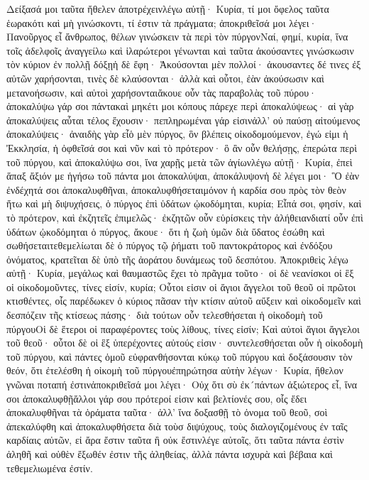 Δείξασά μοι ταῦτα ἤθελεν ἀποτρέχεινλέγω αὐτῇ· Κυρία, τί μοι ὄφελος ταῦτα ἑωρακότι καὶ μὴ γινώσκοντι, τί ἐστιν τὰ πράγματα; ἀποκριθεῖσά μοι λέγει· Πανοῦργος εἶ ἄνθρωπος, θέλων γινώσκειν τὰ περὶ τὸν πύργονΝαί, φημί, κυρία, ἵνα τοῖς ἀδελφοῖς ἀναγγείλω καὶ ἱλαρώτεροι γένωνται καὶ ταῦτα ἀκούσαντες γινώσκωσιν τὸν κύριον ἐν πολλῇ δόξῃἡ δὲ ἔφη· Ἀκούσονται μὲν πολλοί· ἀκουσαντες δέ τινες ἐξ αὐτῶν χαρήσονται, τινὲς δὲ κλαύσονται· ἀλλὰ καὶ οὗτοι, ἐὰν ἀκούσωσιν καὶ μετανοήσωσιν, καὶ αὐτοὶ χαρήσονταιἄκουε οὖν τὰς παραβολὰς τοῦ πύρου· ἀποκαλύψω γάρ σοι πάντακαὶ μηκέτι μοι κόπους πάρεχε περὶ ἀποκαλύψεως· αἱ γὰρ ἀποκαλύψεις αὗται τέλος ἔχουσιν· πεπληρωμέναι γάρ εἰσινἀλλ’ οὐ παύσῃ αἰτούμενος ἀποκαλύψεις· ἀναιδὴς γὰρ εἶὁ μὲν πύργος, ὃν βλέπεις οἰκοδομούμενον, ἐγώ εἰμι ἡ Ἐκκλησία, ἡ ὀφθεῖσά σοι καὶ νῦν καὶ τὸ πρότερον· ὃ ἂν οὖν θελήσῃς, ἐπερώτα περὶ τοῦ πύργου, καὶ ἀποκαλύψω σοι, ἵνα χαρῇς μετὰ τῶν ἁγίωνλέγω αὐτῇ· Κυρία, ἐπεὶ ἅπαξ ἄξιόν με ἡγήσω τοῦ πάντα μοι ἀποκαλύψαι, ἀποκάλυψονἡ δὲ λέγει μοι· Ὃ ἐὰν ἐνδέχητά σοι ἀποκαλυφθῆναι, ἀποκαλυφθήσεταιμόνον ἡ καρδία σου πρὸς τὸν θεὸν ἤτω καὶ μὴ διψυχήσεις, ὁ πύργος ἐπὶ ὑδάτων ᾠκοδόμηται, κυρία; Εἶπά σοι, φησίν, καὶ τὸ πρότερον, καὶ ἐκζητεῖς ἐπιμελῶς· ἐκζητῶν οὖν εὑρίσκεις τὴν ἀλήθειανδιατί οὖν ἐπὶ ὑδάτων ᾠκοδόμηται ὁ πύργος, ἄκουε· ὅτι ἡ ζωὴ ὑμῶν διὰ ὕδατος ἐσώθη καὶ σωθήσεταιτεθεμελίωται δὲ ὁ πύργος τῷ ῥήματι τοῦ παντοκράτορος καὶ ἐνδόξου ὀνόματος, κρατεῖται δὲ ὑπὸ τῆς ἀοράτου δυνάμεως τοῦ δεσπότου.
Ἀποκριθεὶς λέγω αὐτῇ· Κυρία, μεγάλως καὶ θαυμαστῶς ἔχει τὸ πρᾶγμα τοῦτο· οἱ δὲ νεανίσκοι οἱ ἓξ οἱ οἰκοδομοῦντες, τίνες εἰσίν, κυρία; Οὗτοι εἰσιν οἱ ἅγιοι ἄγγελοι τοῦ θεοῦ οἱ πρῶτοι κτισθέντες, οἷς παρέδωκεν ὁ κύριος πᾶσαν τὴν κτίσιν αὐτοῦ αὔξειν καὶ οἰκοδομεῖν καὶ δεσπόζειν τῆς κτίσεως πάσης· διὰ τούτων οὖν τελεσθήσεται ἡ οἰκοδομὴ τοῦ πύργουΟἱ δὲ ἕτεροι οἱ παραφέροντες τοὺς λίθους, τίνες εἰσίν; Καὶ αὐτοὶ ἅγιοι ἄγγελοι τοῦ θεοῦ· οὗτοι δὲ οἱ ἓξ ὑπερέχοντες αὐτούς εἰσιν· συντελεσθήσεται οὖν ἡ οἰκοδομὴ τοῦ πύργου, καὶ πάντες ὁμοῦ εὐφρανθήσονται κύκῳ τοῦ πύργου καὶ δοξάσουσιν τὸν θεόν, ὅτι ἐτελέσθη ἡ οἰκομὴ τοῦ πύργουἐπηρώτησα αὐτὴν λέγων· Κυρία, ἤθελον γνῶναι ποταπή ἐστινἀποκριθεῖσά μοι λέγει· Οὐχ ὅτι σὺ ἐκ´πάντων ἀξιώτερος εἶ, ἵνα σοι ἀποκαλυφθῇἄλλοι γάρ σου πρότεροί εἰσιν καὶ βελτίονές σου, οἷς ἔδει ἀποκαλυφθῆναι τὰ ὁράματα ταῦτα· ἀλλ’ ἵνα δοξασθῇ τὸ ὀνομα τοῦ θεοῦ, σοὶ ἀπεκαλύφθη καὶ ἀποκαλυφθήσετα διὰ τοὺσ διψύχους, τοὺς διαλογιζομένους ἐν ταῖς καρδίαις αὐτῶν, εἰ ἄρα ἔστιν ταῦτα ἢ οὐκ ἔστινλέγε αὐτοῖς, ὅτι ταῦτα πάντα ἐστὶν ἀληθῆ καὶ οὐθὲν ἔξωθέν ἐστιν τῆς ἀληθείας, ἀλλὰ πάντα ισχυρὰ καὶ βέβαια καὶ τεθεμελιωμένα ἐστίν.

